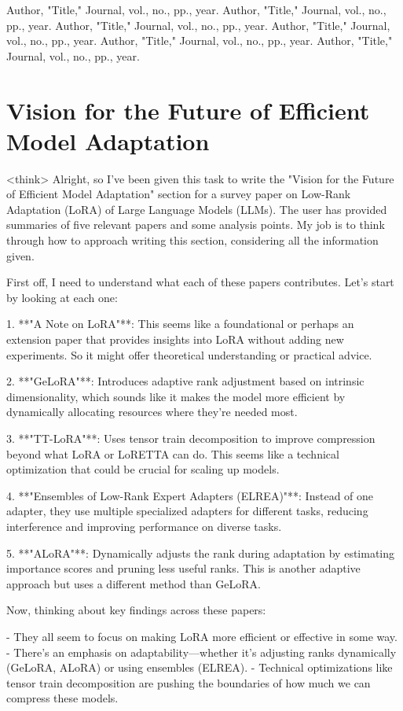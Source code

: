 \documentclass[conference]{IEEEtran}
\begin{document}
\cite{b1} Author, "Title," Journal, vol., no., pp., year.  
\cite{b2} Author, "Title," Journal, vol., no., pp., year.  
\cite{b3} Author, "Title," Journal, vol., no., pp., year.  
\cite{b4} Author, "Title," Journal, vol., no., pp., year.  
\cite{b5} Author, "Title," Journal, vol., no., pp., year.  
\cite{b6} Author, "Title," Journal, vol., no., pp., year.

\section{Vision for the Future of Efficient Model Adaptation}
<think>
Alright, so I've been given this task to write the "Vision for the Future of Efficient Model Adaptation" section for a survey paper on Low-Rank Adaptation (LoRA) of Large Language Models (LLMs). The user has provided summaries of five relevant papers and some analysis points. My job is to think through how to approach writing this section, considering all the information given.

First off, I need to understand what each of these papers contributes. Let's start by looking at each one:

1. **"A Note on LoRA"**: This seems like a foundational or perhaps an extension paper that provides insights into LoRA without adding new experiments. So it might offer theoretical understanding or practical advice.

2. **"GeLoRA"**: Introduces adaptive rank adjustment based on intrinsic dimensionality, which sounds like it makes the model more efficient by dynamically allocating resources where they're needed most.

3. **"TT-LoRA"**: Uses tensor train decomposition to improve compression beyond what LoRA or LoRETTA can do. This seems like a technical optimization that could be crucial for scaling up models.

4. **"Ensembles of Low-Rank Expert Adapters (ELREA)"**: Instead of one adapter, they use multiple specialized adapters for different tasks, reducing interference and improving performance on diverse tasks.

5. **"ALoRA"**: Dynamically adjusts the rank during adaptation by estimating importance scores and pruning less useful ranks. This is another adaptive approach but uses a different method than GeLoRA.

Now, thinking about key findings across these papers:

- They all seem to focus on making LoRA more efficient or effective in some way.
- There's an emphasis on adaptability—whether it's adjusting ranks dynamically (GeLoRA, ALoRA) or using ensembles (ELREA).
- Technical optimizations like tensor train decomposition are pushing the boundaries of how much we can compress these models.
\end{document}

